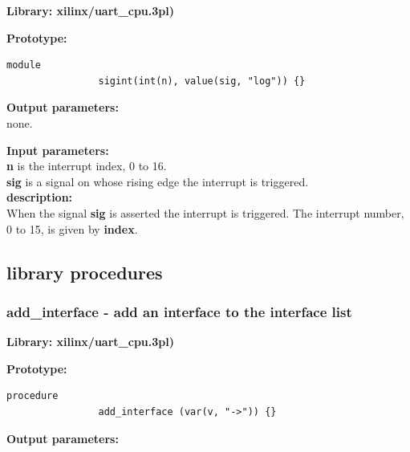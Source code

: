             {\bf Library: xilinx/uart\_cpu.3pl)}

            {\bf Prototype:} \\
            \vsp
            \begin{lstlisting}[gobble=12, language=threepl]
                module
                sigint(int(n), value(sig, "log")) {}
            \end{lstlisting}
            
            {\bf Output parameters:} \\
            
                none.                       
            
            {\bf Input parameters:} \\
                        
                {\bf n} is the interrupt index, 0 to 16.\\
                {\bf sig} is a signal on whose rising edge the interrupt
                is triggered.\\
                       
            {\bf description:} \\
            When the signal {\bf sig} is asserted the interrupt is triggered.
            The interrupt number, 0 to 15, is given by {\bf index}.


    
    \subsection{library procedures}
            


        \subsubsection{add\_interface - add an interface to the interface list}\label{sec:lpuartcpuai}

            {\bf Library: xilinx/uart\_cpu.3pl)}

            {\bf Prototype:} \\
            \vsp
            \begin{lstlisting}[gobble=12, language=threepl]
                procedure
                add_interface (var(v, "->")) {}
            \end{lstlisting}
            
            {\bf Output parameters:} \\
            
